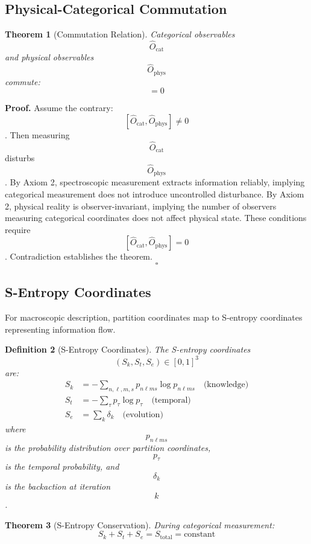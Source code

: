 \documentclass[twocolumn,10pt]{article}
\newtheorem{theorem}{Theorem}[section]
\newtheorem{definition}[theorem]{Definition}
\begin{document}
\subsection{Physical-Categorical Commutation}

\begin{theorem}[Commutation Relation]
Categorical observables $$\hat{O}_{\text{cat}}$$ and physical observables $$\hat{O}_{\text{phys}}$$ commute:
\begin{equation}
[\hat{O}_{\text{cat}}, \hat{O}_{\text{phys}}] = 0
\end{equation}
\end{theorem}

\textbf{Proof.} Assume the contrary: $$[\hat{O}_{\text{cat}}, \hat{O}_{\text{phys}}] \neq 0$$. Then measuring $$\hat{O}_{\text{cat}}$$ disturbs $$\hat{O}_{\text{phys}}$$. By Axiom 2, spectroscopic measurement extracts information reliably, implying categorical measurement does not introduce uncontrolled disturbance. By Axiom 2, physical reality is observer-invariant, implying the number of observers measuring categorical coordinates does not affect physical state. These conditions require $$[\hat{O}_{\text{cat}}, \hat{O}_{\text{phys}}] = 0$$. Contradiction establishes the theorem. \hfill $$\square$$

\subsection{S-Entropy Coordinates}

For macroscopic description, partition coordinates map to S-entropy coordinates representing information flow.

\begin{definition}[S-Entropy Coordinates]
The S-entropy coordinates $$(S_k, S_t, S_e) \in [0,1]^3$$ are:
\begin{align}
S_k &= -\sum_{n,\ell,m,s} p_{n\ell ms} \log p_{n\ell ms} \quad \text{(knowledge)} \\
S_t &= -\sum_{\tau} p_{\tau} \log p_{\tau} \quad \text{(temporal)} \\
S_e &= \sum_k \delta_k \quad \text{(evolution)}
\end{align}
where $$p_{n\ell ms}$$ is the probability distribution over partition coordinates, $$p_\tau$$ is the temporal probability, and $$\delta_k$$ is the backaction at iteration $$k$$.
\end{definition}

\begin{theorem}[S-Entropy Conservation]
During categorical measurement:
\begin{equation}
S_k + S_t + S_e = S_{\text{total}} = \text{constant}
\end{equation}
\end{theorem}
\end{document}
